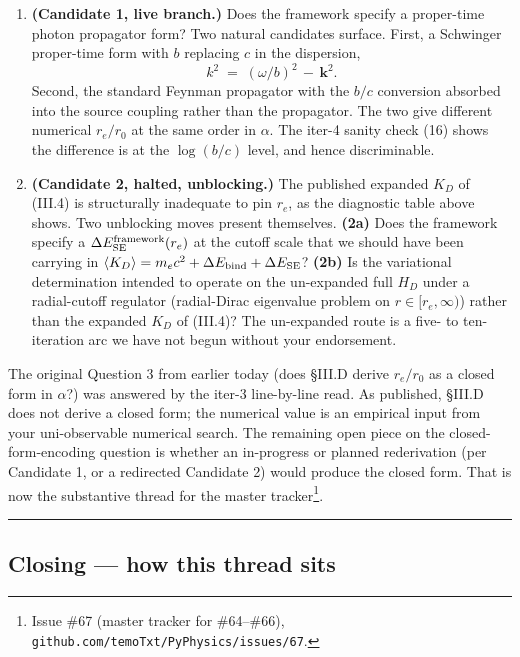 \documentclass[
  11pt,
]{article}
\begin{document}
\begin{enumerate}
\def\labelenumi{\arabic{enumi}.}
\item
  \textbf{(Candidate 1, live branch.)} Does the framework specify a
  proper-time photon propagator form? Two natural candidates surface.
  First, a Schwinger proper-time form with \(b\) replacing \(c\) in the
  dispersion, \[
  k^2 \;=\; (\omega/b)^2 \,-\, \mathbf{k}^2. \tag{18}
  \] Second, the standard Feynman propagator with the \(b/c\) conversion
  absorbed into the source coupling rather than the propagator. The two
  give different numerical \(r_e/r_0\) at the same order in \(\alpha\).
  The iter-4 sanity check (16) shows the difference is at the
  \(\log(b/c)\) level, and hence discriminable.
\item
  \textbf{(Candidate 2, halted, unblocking.)} The published expanded
  \(K_D\) of (III.4) is structurally inadequate to pin \(r_e\), as the
  diagnostic table above shows. Two unblocking moves present themselves.
  \textbf{(2a)} Does the framework specify a
  \(\Delta E_{\rm SE}^{\rm framework}(r_e)\) at the cutoff scale that we
  should have been carrying in
  \(\langle K_D \rangle = m_e c^2 + \Delta E_{\rm bind} + \Delta E_{\rm SE}\)?
  \textbf{(2b)} Is the variational determination intended to operate on
  the un-expanded full \(H_D\) under a radial-cutoff regulator
  (radial-Dirac eigenvalue problem on \(r \in [r_e, \infty)\)) rather
  than the expanded \(K_D\) of (III.4)? The un-expanded route is a five-
  to ten-iteration arc we have not begun without your endorsement.
\end{enumerate}

The original Question 3 from earlier today (does §III.D derive
\(r_e/r_0\) as a closed form in \(\alpha\)?) was answered by the iter-3
line-by-line read. As published, §III.D does not derive a closed form;
the numerical value is an empirical input from your uni-observable
numerical search. The remaining open piece on the closed-form-encoding
question is whether an in-progress or planned rederivation (per
Candidate 1, or a redirected Candidate 2) would produce the closed form.
That is now the substantive thread for the master tracker\footnote{Issue
  \#67 (master tracker for \#64--\#66),
  \texttt{github.com/temoTxt/PyPhysics/issues/67}.}.

\begin{center}\rule{0.5\linewidth}{0.5pt}\end{center}

\hypertarget{closing-how-this-thread-sits}{%
\subsection{Closing --- how this thread
sits}\label{closing-how-this-thread-sits}}
\end{document}
